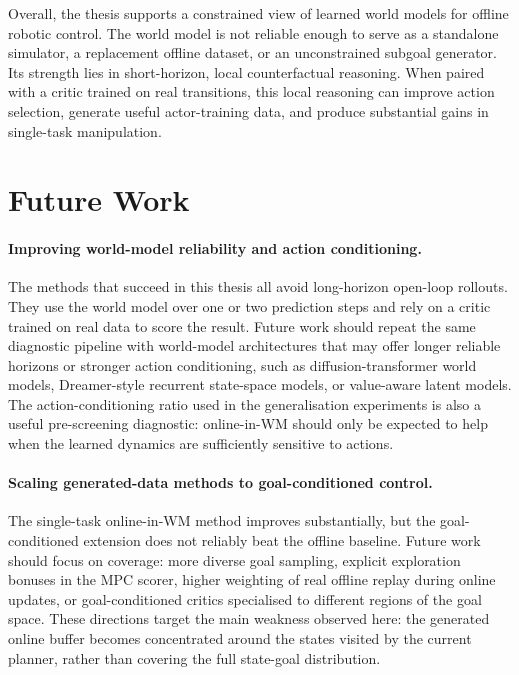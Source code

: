 Overall, the thesis supports a constrained view of learned world models
for offline robotic control. The world model is not reliable enough to
serve as a standalone simulator, a replacement offline dataset, or an
unconstrained subgoal generator. Its strength lies in short-horizon,
local counterfactual reasoning. When paired with a critic trained on
real transitions, this local reasoning can improve action selection,
generate useful actor-training data, and produce substantial gains in
single-task manipulation.

\section{Future Work}
\label{sec:concl-future}

\paragraph{Improving world-model reliability and action conditioning.}
The methods that succeed in this thesis all avoid long-horizon open-loop
rollouts. They use the world model over one or two prediction steps and
rely on a critic trained on real data to score the result. Future work
should repeat the same diagnostic pipeline with world-model
architectures that may offer longer reliable horizons or stronger action
conditioning, such as diffusion-transformer world models,
Dreamer-style recurrent state-space models, or value-aware latent
models. The action-conditioning ratio used in the generalisation
experiments is also a useful pre-screening diagnostic: online-in-WM
should only be expected to help when the learned dynamics are
sufficiently sensitive to actions.

\paragraph{Scaling generated-data methods to goal-conditioned control.}
The single-task online-in-WM method improves substantially, but the
goal-conditioned extension does not reliably beat the offline baseline.
Future work should focus on coverage: more diverse goal sampling,
explicit exploration bonuses in the MPC scorer, higher weighting of
real offline replay during online updates, or goal-conditioned critics
specialised to different regions of the goal space. These directions
target the main weakness observed here: the generated online buffer
becomes concentrated around the states visited by the current planner,
rather than covering the full state-goal distribution.

